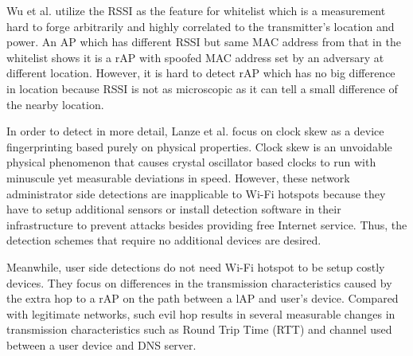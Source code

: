 \documentclass[conference]{IEEEtran}
\begin{document}
Wu et al. \cite{prapd} utilize the RSSI as the feature for whitelist which is a measurement hard to forge arbitrarily and highly correlated to the transmitter's location and power. 
An AP which has different RSSI but same MAC address from that in the whitelist shows it is a rAP with spoofed MAC address set by an adversary at different location.
However, it is hard to detect rAP which has no big difference in location because RSSI is not as microscopic as it can tell a small difference of the nearby location. 

In order to detect in more detail, Lanze et al. \cite{clockskew} focus on clock skew as a device fingerprinting based purely on physical properties.
Clock skew is an unvoidable physical phenomenon that causes crystal oscillator based clocks to run with minuscule yet measurable deviations in speed.
However, these network administrator side detections are inapplicable to Wi-Fi hotspots because they have to setup additional sensors or install detection software in their infrastructure to prevent attacks besides providing free Internet service.
Thus, the detection schemes that require no additional devices are desired.

Meanwhile, user side detections do not need Wi-Fi hotspot to be setup costly devices. 
They focus on differences in the transmission characteristics caused by the extra hop to a rAP on the path between a lAP and user's device. 
Compared with legitimate networks, such evil hop results in several measurable changes in transmission characteristics such as Round Trip Time (RTT) and channel used between a user device and DNS server.
\end{document}
